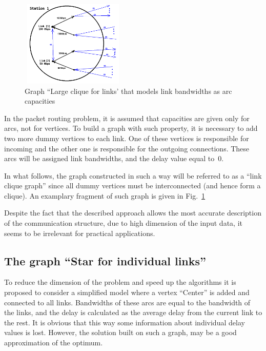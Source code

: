 \documentclass{ifacconf}
\begin{document}
\begin{figure}
\begin{center}
\includegraphics[width=5cm,height=4.1cm]{bandwidthmodel.png}
 \caption{\label{fig:bandwidthmodel}Graph ``Large clique for links' 
that models link bandwidths as arc capacities}
\end{center}
\end{figure}
In the packet routing problem, it
is assumed that capacities are given
only for arcs, not for vertices. To build a graph with such
property, it is necessary to add two more dummy vertices to each link. One of these vertices is
responsible for incoming and the other one is responsible for the outgoing connections. These
arcs will be assigned link bandwidths, and the delay value
equal to~0. 

In what follows, the graph constructed in such a way
will be referred to as a ``link clique graph'' since all dummy vertices must be
interconnected (and hence form a clique). An examplary fragment of such graph is given in
Fig.~\ref{fig:bandwidthmodel}

Despite the fact that the described approach allows the most accurate
description of the communication structure, due to
high dimension of the input data, it seems to be irrelevant for practical applications.

\subsection{The graph ``Star for individual
links''}\label{subsec:linkstar}

To reduce the dimension of the problem and speed up the algorithms
it is proposed to consider a simplified model where a vertex ``Center'' is added
and connected to all links. Bandwidths
of these arcs are equal to the bandwidth of the links, and the delay is calculated
as the average delay from the current link to the rest. It is obvious that
this way some information about individual delay values is lost.
However, the solution built
on such a graph, may be a good approximation of the optimum.
\end{document}
